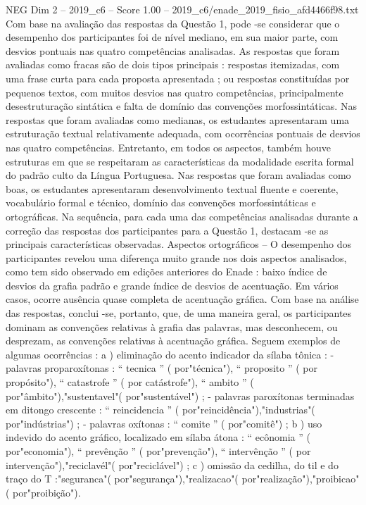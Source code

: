 \begin{textsample}{NEG Dim 2 – 2019\_c6 – Score 1.00 – 2019\_c6/enade\_2019\_fisio\_afd4466f98.txt}
Com base na avaliação das respostas da Questão 1, pode -se considerar que o desempenho dos participantes foi de nível mediano, em sua maior parte, com desvios pontuais nas quatro competências analisadas.
As respostas que foram avaliadas como fracas são de dois tipos principais : respostas itemizadas, com uma frase curta para cada proposta apresentada ; ou respostas constituídas por pequenos textos, com muitos desvios nas quatro competências, principalmente desestruturação sintática e falta de domínio das convenções morfossintáticas.
Nas respostas que foram avaliadas como medianas, os estudantes apresentaram uma estruturação textual relativamente adequada, com ocorrências pontuais de desvios nas quatro competências.
Entretanto, em todos os aspectos, também houve estruturas em que se respeitaram as características da modalidade escrita formal do padrão culto da Língua Portuguesa.
Nas respostas que foram avaliadas como boas, os estudantes apresentaram desenvolvimento textual fluente e coerente, vocabulário formal e técnico, domínio das convenções morfossintáticas e ortográficas.
Na sequência, para cada uma das competências analisadas durante a correção das respostas dos participantes para a Questão 1, destacam -se as principais características observadas.
Aspectos ortográficos – O desempenho dos participantes revelou uma diferença muito grande nos dois aspectos analisados, como tem sido observado em edições anteriores do Enade : baixo índice de desvios da grafia padrão e grande índice de desvios de acentuação.
Em vários casos, ocorre ausência quase completa de acentuação gráfica.
Com base na análise das respostas, conclui -se, portanto, que, de uma maneira geral, os participantes dominam as convenções relativas à grafia das palavras, mas desconhecem, ou desprezam, as convenções relativas à acentuação gráfica.
Seguem exemplos de algumas ocorrências : a ) eliminação do acento indicador da sílaba tônica : - palavras proparoxítonas : “ tecnica ” ( por"técnica"), “ proposito ” ( por propósito"), “ catastrofe ” ( por catástrofe"), “ ambito ” ( por"âmbito"),"sustentavel"( por"sustentável") ; - palavras paroxítonas terminadas em ditongo crescente : “ reincidencia ” ( por"reincidência"),"industrias"( por"indústrias") ; - palavras oxítonas : “ comite ” ( por"comitê") ; b ) uso indevido do acento gráfico, localizado em sílaba átona : “ ecônomia ” ( por"economia"), “ prevênção ” ( por"prevenção"), “ intervênção ” ( por intervenção"),"reciclavél"( por"reciclável") ; c ) omissão da cedilha, do til e do traço do T :"seguranca"( por"segurança"),"realizacao"( por"realização"),"proibicao"( por"proibição").

\end{textsample}
